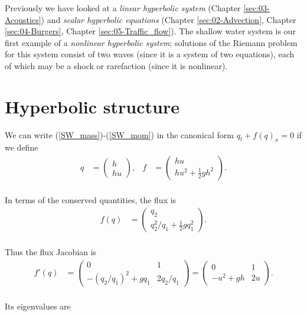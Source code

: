 \documentclass{SIAMbook2016}
\begin{document}
Previously we have looked at a \emph{linear hyperbolic system}
(Chapter \ref{sec:03-Acoustics}) and \emph{scalar hyperbolic equations}
(Chapter \ref{sec:02-Advection}, Chapter \ref{sec:04-Burgers},
Chapter \ref{sec:05-Traffic_flow}). The shallow water system is our
first example of a \emph{nonlinear hyperbolic system}; solutions of the
Riemann problem for this system consist of two waves (since it is a
system of two equations), each of which may be a shock or rarefaction
(since it is nonlinear).

\hypertarget{hyperbolic-structure}{%
\section{Hyperbolic structure}\label{hyperbolic-structure}}

We can write (\ref{SW_mass})-(\ref{SW_mom}) in the canonical form
\(q_t + f(q)_x = 0\) if we define\\
\begin{align}
q & = \begin{pmatrix} h \\ hu \end{pmatrix}, & f & = \begin{pmatrix} hu \\ hu^2 + \frac{1}{2}gh^2 \end{pmatrix}.
\end{align}\\
In terms of the conserved quantities, the flux is\\
\begin{align}
f(q) & = \begin{pmatrix} q_2 \\ q_2^2/q_1 + \frac{1}{2}g q_1^2 \end{pmatrix}.
\end{align}\\
Thus the flux Jacobian is\\
\begin{align}
f'(q) & = \begin{pmatrix} 0 & 1 \\ -(q_2/q_1)^2 + g q_1 & 2 q_2/q_1 \end{pmatrix} 
        = \begin{pmatrix} 0 & 1 \\ -u^2 + g h & 2 u \end{pmatrix}.
\end{align}\\
Its eigenvalues are\\
\end{document}
